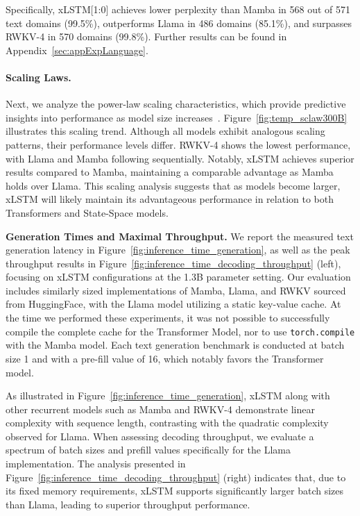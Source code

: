 Specifically, xLSTM[1:0] achieves lower perplexity than Mamba in 568 out of 571 text domains (99.5\%), outperforms Llama in 486 domains (85.1\%), and surpasses RWKV-4 in 570 domains (99.8\%). Further results can be found in Appendix~\ref{sec:appExpLanguage}.

\paragraph{Scaling Laws.} Next, we analyze the power-law scaling characteristics, which provide predictive insights into performance as model size increases~\citep{Kaplan:20,Brown:20short}. Figure~\ref{fig:temp_sclaw300B} illustrates this scaling trend. Although all models exhibit analogous scaling patterns, their performance levels differ. RWKV-4 shows the lowest performance, with Llama and Mamba following sequentially. Notably, xLSTM achieves superior results compared to Mamba, maintaining a comparable advantage as Mamba holds over Llama. This scaling analysis suggests that as models become larger, xLSTM will likely maintain its advantageous performance in relation to both Transformers and State-Space models.

\textbf{Generation Times and Maximal Throughput.} We report the measured text generation latency in Figure~\ref{fig:inference_time_generation}, as well as the peak throughput results in Figure~\ref{fig:inference_time_decoding_throughput} (left), focusing on xLSTM configurations at the 1.3B parameter setting. Our evaluation includes similarly sized implementations of Mamba, Llama, and RWKV sourced from HuggingFace, with the Llama model utilizing a static key-value cache. At the time we performed these experiments, it was not possible to successfully compile the complete cache for the Transformer Model, nor to use \texttt{torch.compile} with the Mamba model. Each text generation benchmark is conducted at batch size 1 and with a pre-fill value of 16, which notably favors the Transformer model. 

As illustrated in Figure~\ref{fig:inference_time_generation}, xLSTM along with other recurrent models such as Mamba and RWKV-4 demonstrate linear complexity with sequence length, contrasting with the quadratic complexity observed for Llama. When assessing decoding throughput, we evaluate a spectrum of batch sizes and prefill values specifically for the Llama implementation. The analysis presented in Figure~\ref{fig:inference_time_decoding_throughput} (right) indicates that, due to its fixed memory requirements, xLSTM supports significantly larger batch sizes than Llama, leading to superior throughput performance.

